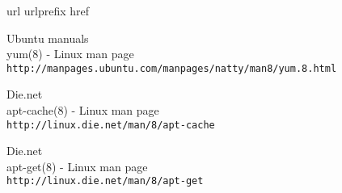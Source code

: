 \begin{thebibliography}{10}
\expandafter\ifx\csname url\endcsname\relax
  \def\url#1{\texttt{#1}}\fi
\expandafter\ifx\csname urlprefix\endcsname\relax\def\urlprefix{URL }\fi
\expandafter\ifx\csname href\endcsname\relax
  \def\href#1#2{#2} \def\path#1{#1}\fi

Ubuntu manuals\\
yum(8) - Linux man page\\
\url{http://manpages.ubuntu.com/manpages/natty/man8/yum.8.html}


Die.net\\
apt-cache(8) - Linux man page\\
  \url{http://linux.die.net/man/8/apt-cache}

Die.net\\
apt-get(8) - Linux man page\\
  \url{http://linux.die.net/man/8/apt-get}


\end{thebibliography}

